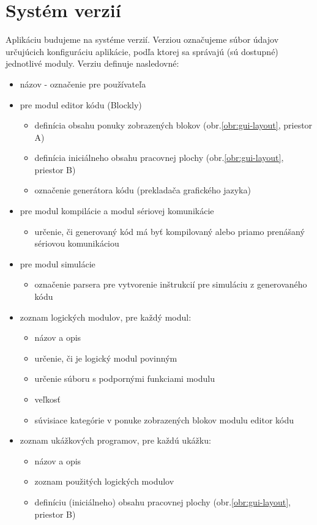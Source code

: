 \section{Systém verzií}
Aplikáciu budujeme na systéme verzií. Verziou označujeme súbor údajov určujúcich konfiguráciu aplikácie, podľa ktorej sa správajú (sú dostupné) jednotlivé moduly. Verziu definuje nasledovné:

\begin{itemize}[noitemsep]
\item názov - označenie pre používateľa
\item pre modul editor kódu (Blockly)
\begin{itemize}[topsep=0pt,itemsep=0pt,partopsep=0pt, parsep=0pt]
\item definícia obsahu ponuky zobrazených blokov (obr.\ref{obr:gui-layout}, priestor A)
\item definícia iniciálneho obsahu pracovnej plochy (obr.\ref{obr:gui-layout}, priestor B)
\item označenie generátora kódu (prekladača grafického jazyka)
\end{itemize}
\item pre modul kompilácie a modul sériovej komunikácie
\begin{itemize}[topsep=0pt,itemsep=0pt,partopsep=0pt, parsep=0pt]
\item určenie, či generovaný kód má byť kompilovaný alebo priamo prenášaný sériovou komunikáciou
\end{itemize}
\item pre modul simulácie
\begin{itemize}[topsep=0pt,itemsep=0pt,partopsep=0pt, parsep=0pt]
\item označenie parsera pre vytvorenie inštrukcií pre simuláciu z generovaného kódu
\end{itemize}
\item zoznam logických modulov, pre každý modul:
\begin{itemize}[topsep=0pt,itemsep=0pt,partopsep=0pt, parsep=0pt]
\item názov a opis
\item určenie, či je logický modul povinným
\item určenie súboru s podpornými funkciami modulu
\item veľkosť
\item súvisiace kategórie v ponuke zobrazených blokov modulu editor kódu
\end{itemize}
\item zoznam ukážkových programov, pre každú ukážku:
\begin{itemize}[topsep=0pt,itemsep=0pt,partopsep=0pt, parsep=0pt]
\item názov a opis
\item zoznam použitých logických modulov
\item definíciu (iniciálneho) obsahu pracovnej plochy (obr.\ref{obr:gui-layout}, priestor B)
\end{itemize}
\end{itemize}

